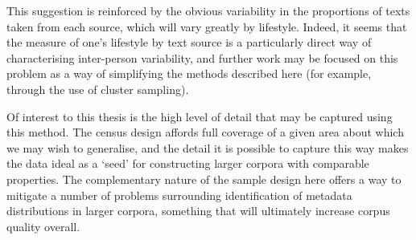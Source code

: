 This suggestion is reinforced by the obvious variability in the proportions of texts taken from each source, which will vary greatly by lifestyle.  Indeed, it seems that the measure of one's lifestyle by text source is a particularly direct way of characterising inter-person variability, and further work may be focused on this problem as a way of simplifying the methods described here (for example, through the use of cluster sampling).


Of interest to this thesis is the high level of detail that may be captured using this method.  The census design affords full coverage of a given area about which we may wish to generalise, and the detail it is possible to capture this way makes the data ideal as a `seed' for constructing larger corpora with comparable properties.  The complementary nature of the sample design here offers a way to mitigate a number of problems surrounding identification of metadata distributions in larger corpora, something that will ultimately increase corpus quality overall.



